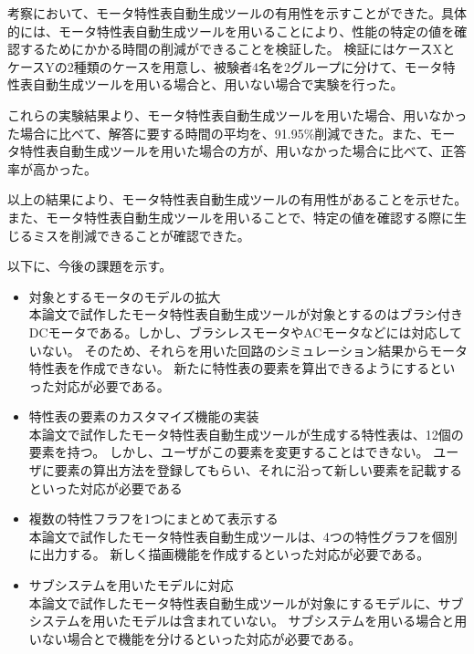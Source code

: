 考察において、モータ特性表自動生成ツールの有用性を示すことができた。具体的には、モータ特性表自動生成ツールを用いることにより、性能の特定の値を確認するためにかかる時間の削減ができることを検証した。
検証にはケースXとケースYの2種類のケースを用意し、被験者4名を2グループに分けて、モータ特性表自動生成ツールを用いる場合と、用いない場合で実験を行った。

これらの実験結果より、モータ特性表自動生成ツールを用いた場合、用いなかった場合に比べて、解答に要する時間の平均を、91.95\%削減できた。また、モータ特性表自動生成ツールを用いた場合の方が、用いなかった場合に比べて、正答率が高かった。

以上の結果により、モータ特性表自動生成ツールの有用性があることを示せた。また、モータ特性表自動生成ツールを用いることで、特定の値を確認する際に生じるミスを削減できることが確認できた。


以下に、今後の課題を示す。

\begin{itemize}
  \item 対象とするモータのモデルの拡大\\
    本論文で試作したモータ特性表自動生成ツールが対象とするのはブラシ付きDCモータである。しかし、ブラシレスモータやACモータなどには対応していない。
    そのため、それらを用いた回路のシミュレーション結果からモータ特性表を作成できない。
    新たに特性表の要素を算出できるようにするといった対応が必要である。

\item 特性表の要素のカスタマイズ機能の実装\\
本論文で試作したモータ特性表自動生成ツールが生成する特性表は、12個の要素を持つ。
  しかし、ユーザがこの要素を変更することはできない。
  ユーザに要素の算出方法を登録してもらい、それに沿って新しい要素を記載するといった対応が必要である

\item 複数の特性フラフを1つにまとめて表示する\\
本論文で試作したモータ特性表自動生成ツールは、4つの特性グラフを個別に出力する。
新しく描画機能を作成するといった対応が必要である。

\item サブシステムを用いたモデルに対応\\
本論文で試作したモータ特性表自動生成ツールが対象にするモデルに、サブシステムを用いたモデルは含まれていない。
サブシステムを用いる場合と用いない場合とで機能を分けるといった対応が必要である。


\end{itemize}



